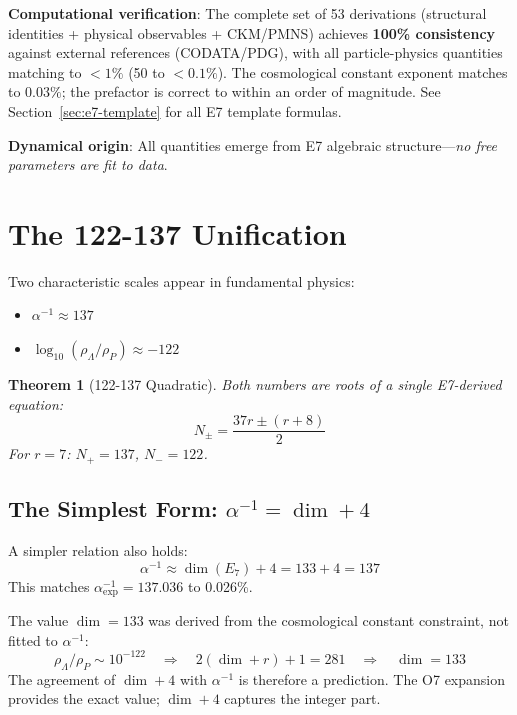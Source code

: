 \documentclass[11pt,a4paper]{article}
\newtheorem{theorem}{Theorem}
\begin{document}
\textbf{Computational verification}: The complete set of 53 derivations (structural identities + physical observables + CKM/PMNS) achieves \textbf{100\% consistency} against external references (CODATA/PDG), with all particle-physics quantities matching to $< 1\%$ (50 to $< 0.1\%$). The cosmological constant exponent matches to $0.03\%$; the prefactor is correct to within an order of magnitude. See Section~\ref{sec:e7-template} for all E7 template formulas.

\textbf{Dynamical origin}: All quantities emerge from E7 algebraic structure---\emph{no free parameters are fit to data}.

\section{The 122-137 Unification}

Two characteristic scales appear in fundamental physics:
\begin{itemize}
\item $\alpha^{-1} \approx 137$
\item $\log_{10}(\rho_\Lambda/\rho_P) \approx -122$
\end{itemize}

\begin{theorem}[122-137 Quadratic]
Both numbers are roots of a single E7-derived equation:
\begin{equation}
N_\pm = \frac{37r \pm (r+8)}{2}
\end{equation}
For $r = 7$: $N_+ = 137$, $N_- = 122$.
\end{theorem}

\subsection{The Simplest Form: $\alpha^{-1} = \dim + 4$}

A simpler relation also holds:
\begin{equation}
\boxed{\alpha^{-1} \approx \dim(E_7) + 4 = 133 + 4 = 137}
\end{equation}
This matches $\alpha^{-1}_{\exp} = 137.036$ to 0.026\%.

The value $\dim = 133$ was derived from the cosmological constant constraint, not fitted to $\alpha^{-1}$:
\begin{equation}
\rho_\Lambda/\rho_P \sim 10^{-122} \quad \Rightarrow \quad 2(\dim + r) + 1 = 281 \quad \Rightarrow \quad \dim = 133
\end{equation}
The agreement of $\dim + 4$ with $\alpha^{-1}$ is therefore a prediction. The O7 expansion provides the exact value; $\dim + 4$ captures the integer part.
\end{document}
